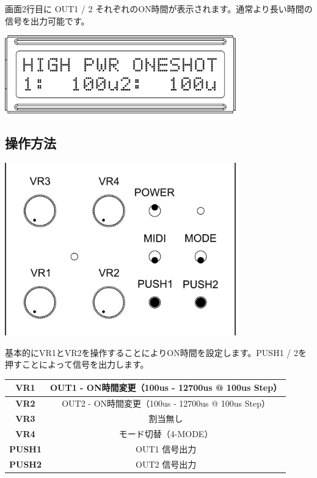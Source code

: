\documentclass[a4paper,11pt]{jsarticle}
\begin{document}
画面2行目に OUT1 / 2 それぞれのON時間が表示されます。通常より長い時間の信号を出力可能です。

\vspace*{5mm}
\begin{center}
\includegraphics[width=100mm]{image/Arduino_Interrupter_v1_LCD_HPOS.png}
\end{center}
\vspace*{5mm}


\subsection{操作方法}

\vspace*{5mm}
\begin{center}
\includegraphics[width=100mm]{image/Arduino_Interrupter_v1_Design_Interrupter.png}
\end{center}
\vspace*{5mm}

基本的にVR1とVR2を操作することによりON時間を設定します。PUSH1 / 2を押すことによって信号を出力します。

\vspace*{5mm}

\begin{table}[htbp]
\begin{center}
\begin{tabular}{ | c | c | }
\hline
\textbf{VR1} & OUT1 - ON時間変更（100us - 12700us @ 100us Step） \\\hline
\textbf{VR2} & OUT2 - ON時間変更（100us - 12700us @ 100us Step） \\\hline
\textbf{VR3} & 割当無し \\\hline
\textbf{VR4} & モード切替（4-MODE） \\\hline
\textbf{PUSH1} & OUT1 信号出力 \\\hline
\textbf{PUSH2} & OUT2 信号出力 \\\hline
\end{tabular}
\end{center}
\end{table}
\end{document}
